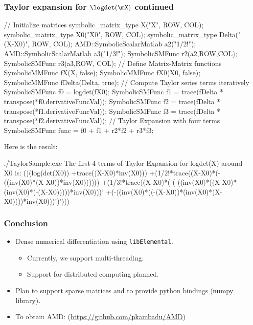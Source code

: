 \begin{frame}[fragile]
\frametitle{Taylor expansion for $\logdet(\mX)$ continued} 
\scriptsize
\begin{semiverbatim}
  \alert{// Initialize matrices}
  symbolic_matrix_type X("X", ROW, COL);
  symbolic_matrix_type X0("X0", ROW, COL);
  symbolic_matrix_type Delta("(X-X0)", ROW, COL);
  AMD::SymbolicScalarMatlab a2("1/2!");
  AMD::SymbolicScalarMatlab a3("1/3!"); 
  SymbolicSMFunc r2(a2,ROW,COL);
  SymbolicSMFunc r3(a3,ROW, COL);
  \alert{// Define Matrix-Matrix functions}
  SymbolicMMFunc fX(X, false);
  SymbolicMMFunc fX0(X0, false);
  SymbolicMMFunc fDelta(Delta, true);
  \alert{// Compute Taylor series terms iteratively} 
  SymbolicSMFunc f0 =  logdet(fX0);
  SymbolicSMFunc f1 = trace(fDelta * transpose(*f0.derivativeFuncVal));
  SymbolicSMFunc f2 = trace(fDelta * transpose(*f1.derivativeFuncVal));
  SymbolicSMFunc f3 = trace(fDelta * transpose(*f2.derivativeFuncVal));
  \alert{// Taylor Expansion with four terms}
  SymbolicSMFunc func = f0 + f1 + r2*f2 + r3*f3;
\end{semiverbatim}
\end{frame}

\begin{frame}[fragile]
Here is the result:
\scriptsize
\begin{semiverbatim}
./TaylorSample.exe
The first 4 terms of Taylor Expansion for logdet(X) around X0 is:
(((log(det(X0))
 +trace((X-X0)*inv(X0)))
 +(1/2!*trace((X-X0)*(-((inv(X0)*(X-X0))*inv(X0))))))
 +(1/3!*trace((X-X0)*( (-((inv(X0)*((X-X0)*(inv(X0)*(-(X-X0)))))*inv(X0)))'
                      +(-((inv(X0)*((-(X-X0))*(inv(X0)*(X-X0))))*inv(X0)))')')))
\end{semiverbatim}
\end{frame}

\begin{frame}
\frametitle{Conclusion} 

\begin{itemize}
\item Dense numerical differentiation using \texttt{libElemental}.

  \begin{itemize}
  \item Currently, we support multi-threading.
  \item Support for distributed computing planned.
  \end{itemize}

\item Plan to support sparse matrices and to provide python bindings
  (numpy library).
\item To obtain AMD: (\alert{\url{https://github.com/pkambadu/AMD}})
\end{itemize}
\end{frame}




